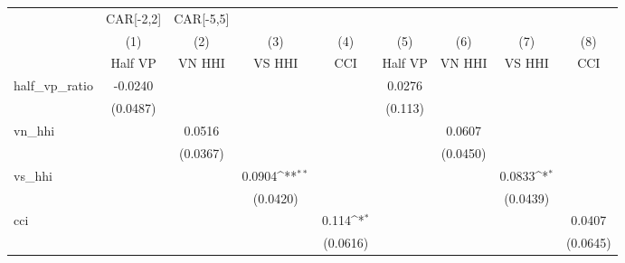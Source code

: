 {
\def\sym#1{\ifmmode^{#1}\else\(^{#1}\)\fi}
\begin{tabular}{l*{8}{c}}
\hline\hline
                    &CAR[-2,2]                                                                              &CAR[-5,5]                                                                              \\
                    &\multicolumn{1}{c}{(1)}&\multicolumn{1}{c}{(2)}&\multicolumn{1}{c}{(3)}&\multicolumn{1}{c}{(4)}&\multicolumn{1}{c}{(5)}&\multicolumn{1}{c}{(6)}&\multicolumn{1}{c}{(7)}&\multicolumn{1}{c}{(8)}\\
                    &\multicolumn{1}{c}{Half VP}&\multicolumn{1}{c}{VN HHI}&\multicolumn{1}{c}{VS HHI}&\multicolumn{1}{c}{CCI}&\multicolumn{1}{c}{Half VP}&\multicolumn{1}{c}{VN HHI}&\multicolumn{1}{c}{VS HHI}&\multicolumn{1}{c}{CCI}\\
\hline
half\_vp\_ratio       &     -0.0240         &                     &                     &                     &      0.0276         &                     &                     &                     \\
                    &    (0.0487)         &                     &                     &                     &     (0.113)         &                     &                     &                     \\
[1em]
vn\_hhi              &                     &      0.0516         &                     &                     &                     &      0.0607         &                     &                     \\
                    &                     &    (0.0367)         &                     &                     &                     &    (0.0450)         &                     &                     \\
[1em]
vs\_hhi              &                     &                     &      0.0904\sym{**} &                     &                     &                     &      0.0833\sym{*}  &                     \\
                    &                     &                     &    (0.0420)         &                     &                     &                     &    (0.0439)         &                     \\
[1em]
cci                 &                     &                     &                     &       0.114\sym{*}  &                     &                     &                     &      0.0407         \\
                    &                     &                     &                     &    (0.0616)         &                     &                     &                     &    (0.0645)         \\

\end{tabular}}

